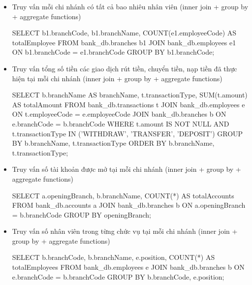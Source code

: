 \begin{itemize}

     \item Truy vấn mỗi chi nhánh có tất cả bao nhiêu nhân viên (inner join + group by + aggregate functions)
    \begin{MySQLCode}
    SELECT 
        b1.branchCode,
        b1.branchName,
        COUNT(e1.employeeCode) AS totalEmployee
    FROM 
        bank_db.branches b1
    JOIN 
        bank_db.employees e1 ON b1.branchCode = e1.branchCode
    GROUP BY 
        b1.branchCode;
    \end{MySQLCode}

    \item Truy vấn tổng số tiền các giao dịch rút tiền, chuyển tiền, nạp tiền đã thực hiện tại mỗi chi nhánh (inner join + group by + aggregate functions)
    \begin{MySQLCode}
    SELECT 
        b.branchName AS branchName,
        t.transactionType,
        SUM(t.amount) AS totalAmount
    FROM 
        bank_db.transactions t
    JOIN 
        bank_db.employees e ON t.employeeCode = e.employeeCode
    JOIN 
        bank_db.branches b ON e.branchCode = b.branchCode
    WHERE 
        t.amount IS NOT NULL
        AND t.transactionType IN ('WITHDRAW', 'TRANSFER', 'DEPOSIT')
    GROUP BY 
        b.branchName, t.transactionType
    ORDER BY 
        b.branchName, t.transactionType;
    \end{MySQLCode}

    \item Truy vấn số tài khoản được mở tại mỗi chi nhánh (inner join + group by + aggregate functions)
    \begin{MySQLCode}
    SELECT 
	a.openingBranch, 
        b.branchName,
        COUNT(*) AS totalAccounts
    FROM 
	bank_db.accounts a
    JOIN
	bank_db.branches b ON a.openingBranch = b.branchCode
    GROUP BY
	openingBranch;
    \end{MySQLCode}

    \item Truy vấn số nhân viên trong từng chức vụ tại mỗi chi nhánh (inner join + group by + aggregate functions)
    \begin{MySQLCode}
    SELECT 
	b.branchCode,
        b.branchName,
        e.position,
        COUNT(*) AS totalEmployees
    FROM 
        bank_db.employees e
    JOIN 
        bank_db.branches b ON e.branchCode = b.branchCode
    GROUP BY 
        b.branchCode, e.position;
    \end{MySQLCode}


\end{itemize}
